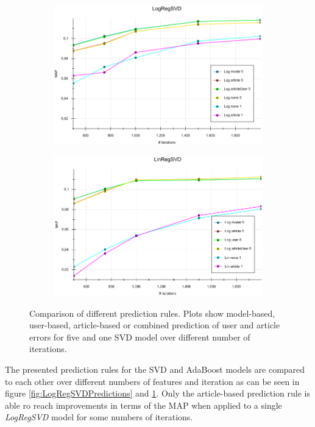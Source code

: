 \documentclass[10pt]{reportMaster}
\begin{document}
\begin{figure}
	\begin{subfigure}[c]{0.5\textwidth}
		\centering
		\includegraphics[width=1\textwidth]{figures/experiments/LogRegSVDPredictionOverIterationNum}
	\end{subfigure}
	\begin{subfigure}[c]{0.5\textwidth}
		\centering
		\includegraphics[width=1\textwidth]{figures/experiments/LinRegSVDPredictionsOIterations}
	\end{subfigure}
	\caption{Comparison of different prediction rules. Plots show model-based, user-based, article-based or combined prediction of user and article errors for five and one SVD model over different number of iterations.}
	\label{fig:LinRegSVDPredictions}
\end{figure}

The presented prediction rules for the SVD and AdaBoost models are compared to each other over different numbers of features and iteration as can be seen in figure \ref{fig:LogRegSVDPredictions} and \ref{fig:LinRegSVDPredictions}.
Only the article-based prediction rule is able ro reach improvements in terms of the MAP when applied to a single \textit{LogRegSVD} model for some numbers of iterations.
\end{document}
